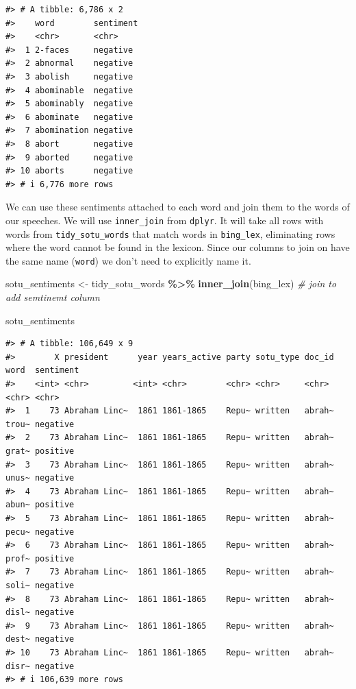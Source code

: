 \documentclass[
]{book}
\newenvironment{Shaded}{\begin{snugshade}}{\end{snugshade}}
\newcommand{\CommentTok}[1]{\textcolor[rgb]{0.56,0.35,0.01}{\textit{#1}}}
\newcommand{\FunctionTok}[1]{\textcolor[rgb]{0.13,0.29,0.53}{\textbf{#1}}}
\newcommand{\NormalTok}[1]{#1}
\newcommand{\OtherTok}[1]{\textcolor[rgb]{0.56,0.35,0.01}{#1}}
\newcommand{\SpecialCharTok}[1]{\textcolor[rgb]{0.81,0.36,0.00}{\textbf{#1}}}
\begin{document}
\begin{verbatim}
#> # A tibble: 6,786 x 2
#>    word        sentiment
#>    <chr>       <chr>    
#>  1 2-faces     negative 
#>  2 abnormal    negative 
#>  3 abolish     negative 
#>  4 abominable  negative 
#>  5 abominably  negative 
#>  6 abominate   negative 
#>  7 abomination negative 
#>  8 abort       negative 
#>  9 aborted     negative 
#> 10 aborts      negative 
#> # i 6,776 more rows
\end{verbatim}

We can use these sentiments attached to each word and join them to the words of our speeches. We will use \texttt{inner\_join} from \texttt{dplyr}. It will take all rows with words from \texttt{tidy\_sotu\_words} that match words in \texttt{bing\_lex}, eliminating rows where the word cannot be found in the lexicon. Since our columns to join on have the same name (\texttt{word}) we don't need to explicitly name it.

\begin{Shaded}
\begin{Highlighting}[]
\NormalTok{sotu\_sentiments }\OtherTok{\textless{}{-}}\NormalTok{ tidy\_sotu\_words }\SpecialCharTok{\%\textgreater{}\%} 
  \FunctionTok{inner\_join}\NormalTok{(bing\_lex)  }\CommentTok{\# join to add semtinemt column}

\NormalTok{sotu\_sentiments}
\end{Highlighting}
\end{Shaded}

\begin{verbatim}
#> # A tibble: 106,649 x 9
#>        X president      year years_active party sotu_type doc_id word  sentiment
#>    <int> <chr>         <int> <chr>        <chr> <chr>     <chr>  <chr> <chr>    
#>  1    73 Abraham Linc~  1861 1861-1865    Repu~ written   abrah~ trou~ negative 
#>  2    73 Abraham Linc~  1861 1861-1865    Repu~ written   abrah~ grat~ positive 
#>  3    73 Abraham Linc~  1861 1861-1865    Repu~ written   abrah~ unus~ negative 
#>  4    73 Abraham Linc~  1861 1861-1865    Repu~ written   abrah~ abun~ positive 
#>  5    73 Abraham Linc~  1861 1861-1865    Repu~ written   abrah~ pecu~ negative 
#>  6    73 Abraham Linc~  1861 1861-1865    Repu~ written   abrah~ prof~ positive 
#>  7    73 Abraham Linc~  1861 1861-1865    Repu~ written   abrah~ soli~ negative 
#>  8    73 Abraham Linc~  1861 1861-1865    Repu~ written   abrah~ disl~ negative 
#>  9    73 Abraham Linc~  1861 1861-1865    Repu~ written   abrah~ dest~ negative 
#> 10    73 Abraham Linc~  1861 1861-1865    Repu~ written   abrah~ disr~ negative 
#> # i 106,639 more rows
\end{verbatim}
\end{document}
